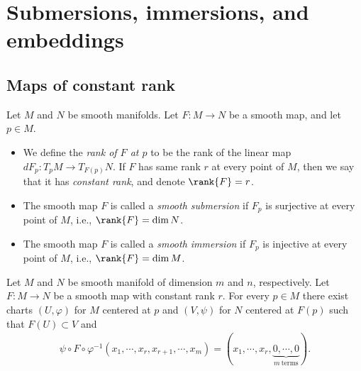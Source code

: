 
\chapter{Submersions, immersions, and embeddings}

\section{Maps of constant rank}

\begin{definition}
    Let $M$ and $N$ be smooth manifolds. Let $F : M \to N$ be a smooth map, and let $p \in M$.
    \begin{itemize}
        \item We define the \emph{rank of $F$ at $p$} to be the rank of the linear map $dF_p : T_pM \to T_{F(p)}N$. If $F$ has same rank $r$ at every point of $M$, then we say that it has \emph{constant rank}, and denote $\rank{F} = r$.
        \item The smooth map $F$ is called a \emph{smooth submersion} if $F_p$ is surjective at every point of $M$, i.e., $\rank{F} = \dim{N}$.
        \item The smooth map $F$ is called a \emph{smooth immersion} if $F_p$ is injective at every point of $M$, i.e., $\rank{F} = \dim{M}$.
    \end{itemize}
\end{definition}

\begin{theorem}
    Let $M$ and $N$ be smooth manifold of dimension $m$ and $n$, respectively. Let $F : M \to N$ be a smooth map with constant rank $r$. For every $p \in M$ there exist charts $(U, \varphi)$ for $M$ centered at $p$ and $(V, \psi)$ for $N$ centered at $F(p)$ such that $F(U) \subset V$ and
        \begin{align*}
            \psi \circ F \circ \varphi^{-1} (x_1, \cdots, x_r, x_{r + 1}, \cdots, x_m)
            = (x_1, \cdots, x_r, \underbrace{0, \cdots, 0}_{m \ \mathrm{ terms}}).
        \end{align*}
\end{theorem}




